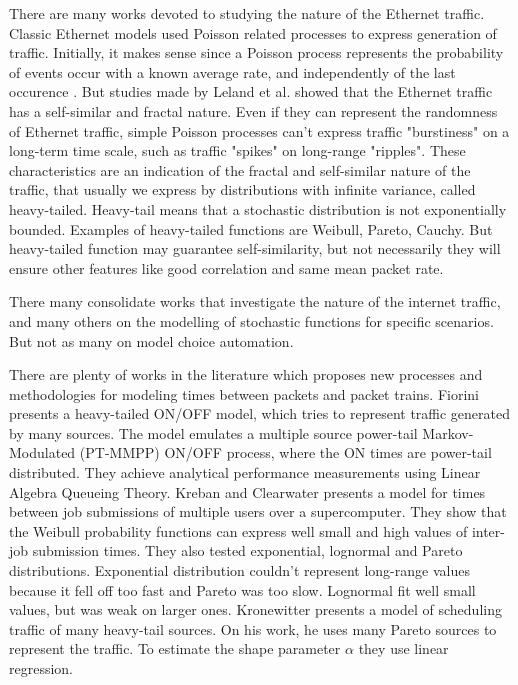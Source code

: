 There are many works devoted to studying the nature of the Ethernet traffic\cite{selfsimilar-ethernet}. Classic Ethernet models used Poisson related processes to express generation of traffic. Initially, it makes sense since a Poisson process represents the probability of events occur with a known average rate, and independently of the last occurence\cite{selfsimilar-ethernet} \cite{book-poisson}. But studies made by Leland et al.\cite{selfsimilar-ethernet} showed that the Ethernet traffic has a self-similar and fractal nature. Even if they can represent the randomness of Ethernet traffic, simple Poisson processes can't express traffic "burstiness" on a long-term time scale, such as traffic "spikes" on long-range "ripples". These characteristics are an indication of the fractal and self-similar nature of the traffic, that usually we express by distributions with infinite variance, called heavy-tailed. Heavy-tail means that a stochastic distribution is not exponentially bounded\cite{sourcesonoff-paper}. Examples of heavy-tailed functions are Weibull, Pareto, Cauchy.  But heavy-tailed function may guarantee self-similarity, but not necessarily they will ensure other features like good correlation and same mean packet rate.

There many consolidate works that investigate the nature of the internet traffic\cite{selfsimilar-ethernet}\cite{analysis-self-similar}\cite{stochartic-selfsimilar}\cite{selfsimilar-highvariability}\cite{multi-player-online-game-self-similarity}, and many others on the modelling of stochastic functions for specific scenarios\cite{estimation-renewal-function-ethernet-traffic}\cite{modelling-of-self-similar}\cite{empirical-interarrival-study}\cite{modeling-concurrent-heavy-tailed}\cite{optimal-scheduling-of-heavy-tailed-traffic}\cite{modelling-of-self-similar}. But not as many on model choice automation\cite{sourcesonoff-paper}.


There are plenty of works in the literature which proposes new processes and methodologies for modeling times between packets and packet trains. Fiorini \cite{modeling-concurrent-heavy-tailed} presents a heavy-tailed ON/OFF model, which tries to represent traffic generated by many sources. The model emulates a multiple source power-tail Markov-Modulated (PT-MMPP) ON/OFF process, where the ON times are power-tail distributed. They achieve analytical performance measurements using Linear Algebra Queueing Theory. Kreban and Clearwater\cite{hierarchical-dynamics-interarrival-times} presents a model for times between job submissions of multiple users over a supercomputer. They show that the Weibull probability functions can express well small and high values of inter-job submission times. They also tested exponential, lognormal and Pareto distributions. Exponential distribution couldn't represent long-range values because it fell off too fast and Pareto was too slow. Lognormal fit well small values, but was weak on larger ones. Kronewitter\cite{optimal-scheduling-of-heavy-tailed-traffic} presents a model of scheduling traffic of many heavy-tail sources. On his work, he uses many Pareto sources to represent the traffic. To estimate the shape parameter $\alpha$ they use linear regression.


